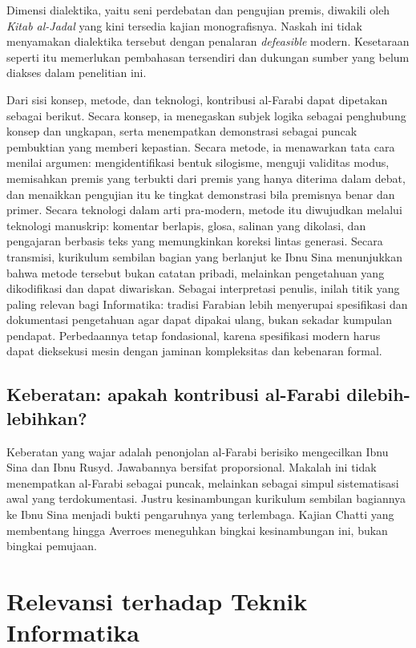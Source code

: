 \documentclass[12pt,a4paper]{article}
\begin{document}
Dimensi dialektika, yaitu seni perdebatan dan pengujian premis, diwakili oleh \emph{Kitab al-Jadal} yang kini tersedia kajian monografisnya.\autocite{dipasquale2019} Naskah ini tidak menyamakan dialektika tersebut dengan penalaran \emph{defeasible} modern. Kesetaraan seperti itu memerlukan pembahasan tersendiri dan dukungan sumber yang belum diakses dalam penelitian ini.

Dari sisi konsep, metode, dan teknologi, kontribusi al-Farabi dapat dipetakan sebagai berikut. Secara konsep, ia menegaskan subjek logika sebagai penghubung konsep dan ungkapan, serta menempatkan demonstrasi sebagai puncak pembuktian yang memberi kepastian. Secara metode, ia menawarkan tata cara menilai argumen: mengidentifikasi bentuk silogisme, menguji validitas modus, memisahkan premis yang terbukti dari premis yang hanya diterima dalam debat, dan menaikkan pengujian itu ke tingkat demonstrasi bila premisnya benar dan primer. Secara teknologi dalam arti pra-modern, metode itu diwujudkan melalui teknologi manuskrip: komentar berlapis, glosa, salinan yang dikolasi, dan pengajaran berbasis teks yang memungkinkan koreksi lintas generasi. Secara transmisi, kurikulum sembilan bagian yang berlanjut ke Ibnu Sina menunjukkan bahwa metode tersebut bukan catatan pribadi, melainkan pengetahuan yang dikodifikasi dan dapat diwariskan.\autocite{gutas2025} Sebagai interpretasi penulis, inilah titik yang paling relevan bagi Informatika: tradisi Farabian lebih menyerupai spesifikasi dan dokumentasi pengetahuan agar dapat dipakai ulang, bukan sekadar kumpulan pendapat. Perbedaannya tetap fondasional, karena spesifikasi modern harus dapat dieksekusi mesin dengan jaminan kompleksitas dan kebenaran formal.

\subsection{Keberatan: apakah kontribusi al-Farabi dilebih-lebihkan?}

Keberatan yang wajar adalah penonjolan al-Farabi berisiko mengecilkan Ibnu Sina dan Ibnu Rusyd. Jawabannya bersifat proporsional. Makalah ini tidak menempatkan al-Farabi sebagai puncak, melainkan sebagai simpul sistematisasi awal yang terdokumentasi. Justru kesinambungan kurikulum sembilan bagiannya ke Ibnu Sina menjadi bukti pengaruhnya yang terlembaga.\autocite{gutas2025} Kajian Chatti yang membentang hingga Averroes meneguhkan bingkai kesinambungan ini, bukan bingkai pemujaan.\autocite{chatti2019}

\section{Relevansi terhadap Teknik Informatika}
\end{document}
